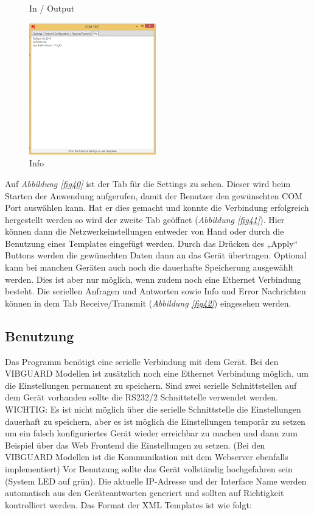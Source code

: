 \documentclass{article}
\begin{document}
\begin{figure}
\begin{varwidth}[t]{\linewidth}
				\caption{In / Output}
				\label{fig42}	
			\end{varwidth}
			\begin{varwidth}[t]{\linewidth}
				\includegraphics[width=0.49\textwidth]{Bilder/14.png}
				\caption{Info}
				\label{fig43}
			\end{varwidth}
		\end{figure}
	
		
		Auf \textit{Abbildung \ref{fig40}} ist der Tab für die Settings zu sehen. Dieser wird beim Starten der Anwendung aufgerufen, damit der Benutzer den gewünschten COM Port auswählen kann. Hat er dies gemacht und konnte die Verbindung erfolgreich hergestellt werden so wird der zweite Tab geöffnet (\textit{Abbildung \ref{fig41}}). Hier können dann die Netzwerkeinstellungen entweder von Hand oder durch die Benutzung eines Templates eingefügt werden. Durch das Drücken des „Apply“ Buttons werden die gewünschten Daten dann an das Gerät übertragen. Optional kann bei manchen Geräten auch noch die dauerhafte Speicherung ausgewählt werden. Dies ist aber nur möglich, wenn zudem noch eine Ethernet Verbindung besteht.
		Die seriellen Anfragen und Antworten sowie Info und Error Nachrichten können in dem Tab Receive/Transmit (\textit{Abbildung \ref{fig42}}) eingesehen werden.
	\subsection{Benutzung}
		Das Programm benötigt eine serielle Verbindung mit dem Gerät. Bei den VIBGUARD Modellen ist zusätzlich noch eine Ethernet Verbindung möglich, um die Einstellungen permanent zu speichern. 
		Sind zwei serielle Schnittstellen auf dem Gerät vorhanden sollte die RS232/2 Schnittstelle verwendet werden.
		WICHTIG: Es ist nicht möglich über die serielle Schnittstelle die Einstellungen dauerhaft zu speichern, aber es ist möglich die Einstellungen temporär zu setzen um ein falsch konfiguriertes Gerät wieder erreichbar zu machen und dann zum Beispiel über das Web Frontend die Einstellungen zu setzen. (Bei den VIBGUARD Modellen ist die Kommunikation mit dem Webserver ebenfalls implementiert)
		Vor Benutzung sollte das Gerät vollständig hochgefahren sein (System LED auf grün).
		Die aktuelle IP-Adresse und der Interface Name werden automatisch aus den Geräteantworten generiert und sollten auf Richtigkeit kontrolliert werden.
		Das Format der XML Templates ist wie folgt:\\\\\\
		
\end{document}
